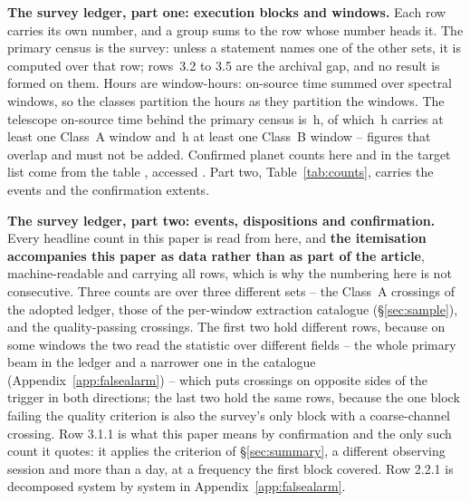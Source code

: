 \begin{table}
\centering
\scriptsize
\caption{\textbf{The survey ledger, part one: execution blocks and windows.}
Each row carries its own number, and a group sums to the row whose number
heads it. The
primary census is the survey: unless a statement names one of the other sets,
it is computed over that row; rows~3.2 to 3.5 are the archival gap, and no
result is formed on them. Hours are window-hours: on-source time summed
over spectral windows, so the classes partition the hours as they partition
the windows. The telescope on-source time behind the primary census is
\StTelHours\,h, of which \StTelHoursFine\,h carries at least one Class~A
window and \StTelHoursCoarse\,h at least one Class~B window -- figures that
overlap and must not be added. Confirmed planet counts here and in the
target list come from the \SfHostCatalogue{} \SfHostTable{} table
\citep{NEA2013}, accessed \SfHostDate. Part two, Table~\ref{tab:counts},
carries the events and the confirmation extents.}
\label{tab:blockledger}

\end{table}

\begin{table}
\centering
\scriptsize
\caption{\textbf{The survey ledger, part two: events, dispositions and
confirmation.} Every headline count in this paper is read from here, and
\textbf{the itemisation accompanies this paper
as data rather than as part of the article}, machine-readable and carrying all
\MtCountRows{} rows, which is why the numbering here is not consecutive. Three
counts are \MtCrossA{} over three different sets -- the Class~A crossings of
the adopted ledger, those of the per-window extraction catalogue
(\S\ref{sec:sample}), and the
quality-passing crossings. The first two hold different rows, because on some
windows the two read the statistic over different fields -- the whole primary
beam in the ledger and a narrower one in the catalogue
(Appendix~\ref{app:falsealarm}) -- which puts crossings on opposite sides of
the trigger in both directions; the last two hold the same rows,
because the one block failing the quality criterion is also the survey's only
block with a coarse-channel crossing. Row 3.1.1 is what this
paper means by confirmation and the only such count it quotes: it applies the
criterion of \S\ref{sec:summary}, a different observing session and more than
a day, at a frequency the first block covered. Row 2.2.1 is
decomposed system by system in Appendix~\ref{app:falsealarm}.}
\label{tab:counts}

\end{table}

